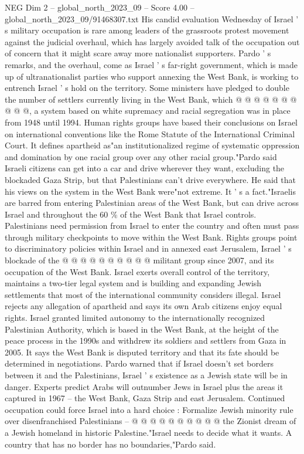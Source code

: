 \begin{textsample}{NEG Dim 2 – global\_north\_2023\_09 – Score 4.00 – global\_north\_2023\_09/91468307.txt}
His candid evaluation Wednesday of Israel ' s military occupation is rare among leaders of the grassroots protest movement against the judicial overhaul, which has largely avoided talk of the occupation out of concern that it might scare away more nationalist supporters.
Pardo ' s remarks, and the overhaul, come as Israel ' s far-right government, which is made up of ultranationalist parties who support annexing the West Bank, is working to entrench Israel ' s hold on the territory.
Some ministers have pledged to double the number of settlers currently living in the West Bank, which @ @ @ @ @ @ @ @ @ @, a system based on white supremacy and racial segregation was in place from 1948 until 1994.
Human rights groups have based their conclusions on Israel on international conventions like the Rome Statute of the International Criminal Court.
It defines apartheid as"an institutionalized regime of systematic oppression and domination by one racial group over any other racial group."Pardo said Israeli citizens can get into a car and drive wherever they want, excluding the blockaded Gaza Strip, but that Palestinians can't drive everywhere.
He said that his views on the system in the West Bank were"not extreme.
It ' s a fact."Israelis are barred from entering Palestinian areas of the West Bank, but can drive across Israel and throughout the 60 \% of the West Bank that Israel controls.
Palestinians need permission from Israel to enter the country and often must pass through military checkpoints to move within the West Bank.
Rights groups point to discriminatory policies within Israel and in annexed east Jerusalem, Israel ' s blockade of the @ @ @ @ @ @ @ @ @ @ militant group since 2007, and its occupation of the West Bank.
Israel exerts overall control of the territory, maintains a two-tier legal system and is building and expanding Jewish settlements that most of the international community considers illegal.
Israel rejects any allegation of apartheid and says its own Arab citizens enjoy equal rights.
Israel granted limited autonomy to the internationally recognized Palestinian Authority, which is based in the West Bank, at the height of the peace process in the 1990s and withdrew its soldiers and settlers from Gaza in 2005.
It says the West Bank is disputed territory and that its fate should be determined in negotiations.
Pardo warned that if Israel doesn't set borders between it and the Palestinians, Israel ' s existence as a Jewish state will be in danger.
Experts predict Arabs will outnumber Jews in Israel plus the areas it captured in 1967 -- the West Bank, Gaza Strip and east Jerusalem.
Continued occupation could force Israel into a hard choice : Formalize Jewish minority rule over disenfranchised Palestinians -- @ @ @ @ @ @ @ @ @ @ the Zionist dream of a Jewish homeland in historic Palestine."Israel needs to decide what it wants.
A country that has no border has no boundaries,"Pardo said.

\end{textsample}
